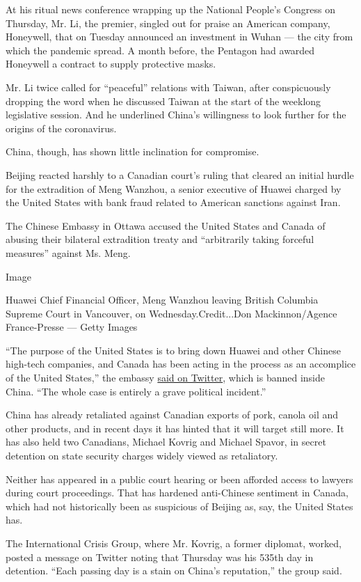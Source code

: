 At his ritual news conference wrapping up the National People's Congress
on Thursday, Mr. Li, the premier, singled out for praise an American
company, Honeywell, that on Tuesday announced an investment in Wuhan ---
the city from which the pandemic spread. A month before, the Pentagon
had awarded Honeywell a contract to supply protective masks.

Mr. Li twice called for ``peaceful'' relations with Taiwan, after
conspicuously dropping the word when he discussed Taiwan at the start of
the weeklong legislative session. And he underlined China's willingness
to look further for the origins of the coronavirus.

China, though, has shown little inclination for compromise.

Beijing reacted harshly to a Canadian court's ruling that cleared an
initial hurdle for the extradition of Meng Wanzhou, a senior executive
of Huawei charged by the United States with bank fraud related to
American sanctions against Iran.

The Chinese Embassy in Ottawa accused the United States and Canada of
abusing their bilateral extradition treaty and ``arbitrarily taking
forceful measures'' against Ms. Meng.

Image

Huawei Chief Financial Officer, Meng Wanzhou leaving British Columbia
Supreme Court in Vancouver, on Wednesday.Credit...Don Mackinnon/Agence
France-Presse --- Getty Images

``The purpose of the United States is to bring down Huawei and other
Chinese high-tech companies, and Canada has been acting in the process
as an accomplice of the United States,'' the embassy
\href{https://twitter.com/ChinaEmbOttawa/status/1265762374004494338}{said
on Twitter}, which is banned inside China. ``The whole case is entirely
a grave political incident.''

China has already retaliated against Canadian exports of pork, canola
oil and other products, and in recent days it has hinted that it will
target still more. It has also held two Canadians, Michael Kovrig and
Michael Spavor, in secret detention on state security charges widely
viewed as retaliatory.

Neither has appeared in a public court hearing or been afforded access
to lawyers during court proceedings. That has hardened anti-Chinese
sentiment in Canada, which had not historically been as suspicious of
Beijing as, say, the United States has.

The International Crisis Group, where Mr. Kovrig, a former diplomat,
worked, posted a message on Twitter noting that Thursday was his 535th
day in detention. ``Each passing day is a stain on China's reputation,''
the group said.

